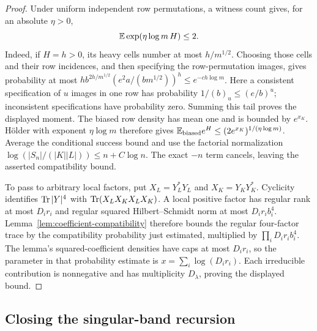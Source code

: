\begin{proof}
Under uniform independent row permutations, a witness count gives,
for an absolute $\eta>0$,
\[
 \mathbb E\exp(\eta\log m\,H)\le2.
\]
Indeed, if $H=h>0$, its heavy cells number at most $h/m^{1/2}$.
Choosing those cells and their row incidences, and then specifying
the row-permutation images, gives probability at most
$h b^{2h/m^{1/2}}(e^2a/(bm^{1/2}))^h\le e^{-ch\log m}$.
Here a consistent specification of $u$ images in one row has
probability $1/(b)_u\le(e/b)^u$; inconsistent specifications have
probability zero.  Summing this tail proves the displayed moment.
The biased row density has mean one and is bounded by $e^{x_K}$.
H\"older with exponent $\eta\log m$ therefore gives
$\mathbb E_{\rm biased}e^H\le(2e^{x_K})^{1/(\eta\log m)}$.
Average the conditional success bound and use the factorial
normalization $\log(|S_n|/(|K||L|))\le n+C\log n$.
The exact $-n$ term cancels, leaving the asserted compatibility
bound.

To pass to arbitrary local factors, put $X_L=Y_L^*Y_L$ and
$X_K=Y_KY_K^*$. Cyclicity identifies $\operatorname{Tr}|Y|^4$ with
$\operatorname{Tr}(X_LX_KX_LX_K)$. A local positive factor has regular rank
at most $D_ir_i$ and regular squared Hilbert--Schmidt norm at most
$D_ir_ib_i^4$. Lemma~\ref{lem:coefficient-compatibility} therefore
bounds the regular four-factor trace by the compatibility probability
just estimated, multiplied by $\prod_iD_ir_ib_i^4$. The lemma's
squared-coefficient densities have caps at most $D_ir_i$, so the
parameter in that probability estimate is $x=\sum_i\log(D_ir_i)$.
Each irreducible contribution is nonnegative and has multiplicity
$D_\lambda$, proving the displayed bound.
\end{proof}

\subsection{Closing the singular-band recursion}

